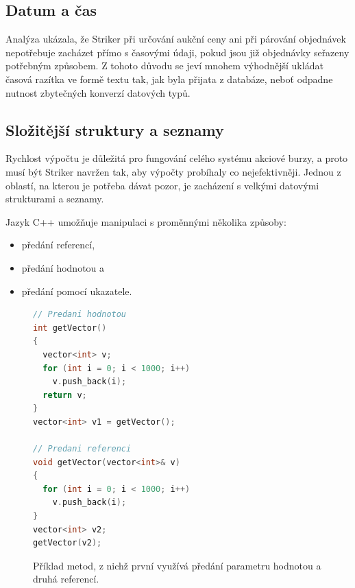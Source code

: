 \documentclass[thesis=M,czech]{FITthesis}[2012/06/26]
\begin{document}

\subsection{Datum a čas}

Analýza ukázala, že Striker při určování aukční ceny ani při párování objednávek nepotřebuje zacházet přímo s časovými údaji, 
pokud jsou již objednávky seřazeny potřebným způsobem. Z tohoto důvodu se jeví mnohem výhodnější ukládat časová razítka
ve formě textu tak, jak byla přijata z databáze, neboť odpadne nutnost zbytečných konverzí datových typů.


\subsection{Složitější struktury a seznamy}

Rychlost výpočtu je důležitá pro fungování celého systému akciové burzy, a proto musí být Striker navržen tak, aby výpočty probíhaly co 
nejefektivněji. Jednou z oblastí, na kterou je potřeba dávat pozor, je zacházení s velkými datovými strukturami a seznamy.

Jazyk C++ umožňuje manipulaci s proměnnými několika způsoby:

\begin{itemize}
	\item předání referencí,
	\item předání hodnotou a 
	\item předání pomocí ukazatele.
\end{itemize}


\begin{figure}\centering
	\begin{lstlisting}[language=C++, basicstyle={\scriptsize\ttfamily}, frame=single] 
// Predani hodnotou
int getVector()
{
  vector<int> v;
  for (int i = 0; i < 1000; i++)
    v.push_back(i);
  return v;
}
vector<int> v1 = getVector();

// Predani referenci
void getVector(vector<int>& v)
{
  for (int i = 0; i < 1000; i++)
    v.push_back(i);
}
vector<int> v2;
getVector(v2);
	\end{lstlisting}
	\caption[Předání referencí vs. hodnotou v jazyce C++]{Příklad metod, z nichž první využívá předání parametru hodnotou a druhá referencí.}\label{fig:cpp-refval}
\end{figure}
\end{document}
